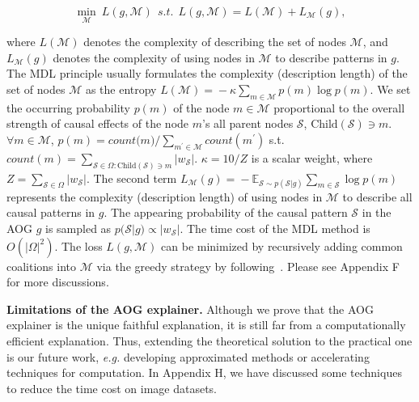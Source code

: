 \documentclass[10pt,twocolumn,letterpaper]{article}
\begin{document}
\vspace{-10pt}
\begin{small}
\begin{equation}
    \min_{\mathcal{M}}\ L(g,\mathcal{M})
    \ \ 
    s.t.
    \ \ 
    L(g,\mathcal{M})=L(\mathcal{M})+L_\mathcal{M}(g),
\label{eq:mdl-objective}
\end{equation}
\end{small}
\!\!where {\small$L(\mathcal{M})$} denotes the complexity of describing the set of nodes {\small$\mathcal{M}$}, and {\small$L_\mathcal{M}(g)$} denotes the complexity of using nodes in {\small$\mathcal{M}$} to describe patterns in {\small$g$}.
The MDL principle usually formulates the complexity (description length) of the set of nodes {\small$\mathcal{M}$} as the entropy {\small$L(\mathcal{M})\!\!=\!\!-\kappa \sum_{m\in \mathcal{M}}p(m)\log {p(m)}$}.
We set the occurring probability {\small$p(m)$} of the node {\small$m\!\in\! \mathcal{M}$} proportional to the overall strength of causal effects of the node {\small$m$}'s all parent nodes {\small$\mathcal{S}$}, {\small$\text{Child}(\mathcal{S})\!\ni\! m$}.
{\small$\forall m\!\!\in\!\! \mathcal{M}$}, {\small$p(m)\!\!=\!\!{\textit{count(m)}}/{\sum_{m^{\prime}\in \mathcal{M}} \textit{count}(m^{\prime})}$} s.t.
{\small $\textit{count}(m)\!\!=\!\!\sum_{\mathcal{S}\in \Omega:\text{Child}(\mathcal{S})\ni m} |w_{\mathcal{S}}|$}.
{$\kappa\!\!=\!\!10/Z$} is a scalar weight, where {\small $Z\!\!=\!\!\sum_{\mathcal{S}\in\Omega} |w_{\mathcal{S}}|$}.
The second term  {\small $L_{\mathcal{M}}(g) \!\!=\!\!- \mathbb{E}_{\mathcal{S}\sim p(\mathcal{S}|g)}\sum_{m\in \mathcal{S}} \log {p(m)}$} represents the complexity (description length) of using nodes in {\small$\mathcal{M}$} to describe all causal patterns in {\small$g$}.
The appearing probability of the causal pattern {\small $\mathcal{S}$} in the AOG {\small$g$} is sampled as 
{\small $p(\mathcal{S}|g)\!\propto\! |w_{\mathcal{S}}|$}.
The time cost of the MDL method is {\small$O(|\Omega|^2)$}.
The loss {\small $L(g,\mathcal{M})$} can be minimized by recursively adding common coalitions into {\small$\mathcal{M}$} via the greedy strategy by following~\cite{hansen2001model}.
Please see Appendix F for more discussions.


\textbf{Limitations of the AOG explainer.}
Although we prove that the AOG explainer is the unique faithful explanation, it is still far from a computationally efficient explanation.
Thus, extending the theoretical solution to the practical one is our future work, \emph{e.g.} developing approximated methods or accelerating techniques for computation.
In Appendix H, we have discussed some techniques to reduce the time cost on image datasets.
\end{document}
